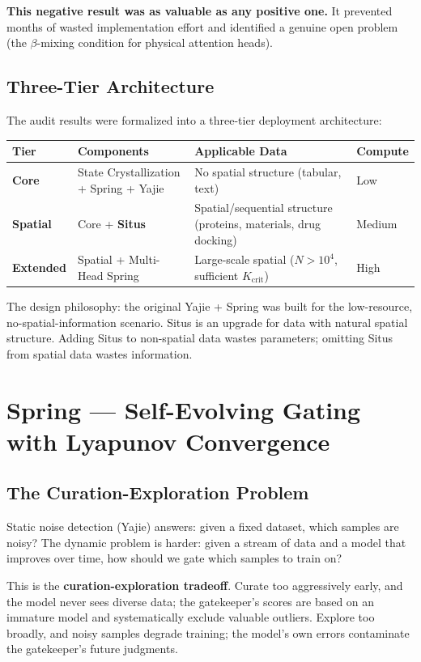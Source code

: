 \documentclass[12pt,a4paper]{ctexart}
\begin{document}
\textbf{This negative result was as valuable as any positive one.} It prevented months of wasted implementation effort and identified a genuine open problem (the $\beta$-mixing condition for physical attention heads).

\subsection{Three-Tier Architecture}

The audit results were formalized into a three-tier deployment architecture:

\begin{table}[htbp]
\centering
\begin{tabular}{@{}llll@{}}
\toprule
Tier & Components & Applicable Data & Compute \\
\midrule
\textbf{Core} & State Crystallization + Spring + Yajie & No spatial structure (tabular, text) & Low \\
\textbf{Spatial} & Core + \textbf{Situs} & Spatial/sequential structure (proteins, materials, drug docking) & Medium \\
\textbf{Extended} & Spatial + Multi-Head Spring & Large-scale spatial ($N > 10^4$, sufficient $K_{\text{crit}}$) & High \\
\bottomrule
\end{tabular}
\end{table}

The design philosophy: the original Yajie + Spring was built for the low-resource, no-spatial-information scenario. Situs is an upgrade for data with natural spatial structure. Adding Situs to non-spatial data wastes parameters; omitting Situs from spatial data wastes information.

\section{Spring — Self-Evolving Gating with Lyapunov Convergence}

\subsection{The Curation-Exploration Problem}

Static noise detection (Yajie) answers: given a fixed dataset, which samples are noisy? The dynamic problem is harder: given a stream of data and a model that improves over time, how should we gate which samples to train on?

This is the \textbf{curation-exploration tradeoff}. Curate too aggressively early, and the model never sees diverse data; the gatekeeper's scores are based on an immature model and systematically exclude valuable outliers. Explore too broadly, and noisy samples degrade training; the model's own errors contaminate the gatekeeper's future judgments.
\end{document}
